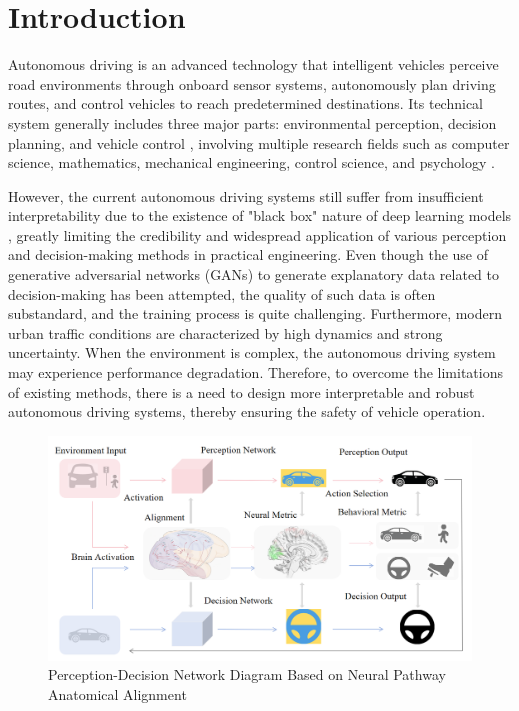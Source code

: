 \section{Introduction}
\label{sec:intro}
\hspace{1pc}Autonomous driving \cite{urmson2008autonomous} is an advanced technology that intelligent vehicles perceive road environments through onboard sensor systems, autonomously plan driving routes, and control vehicles to reach predetermined destinations. 
Its technical system generally includes three major parts: environmental perception, decision planning, and vehicle control \cite{amini2020learning, montemerlo2008junior}, involving multiple research fields such as computer science, mathematics, mechanical engineering, control science, and psychology \cite{chen2015deepdriving}.


However, the current autonomous driving systems still suffer from insufficient interpretability due to the existence of "black box" nature of deep learning models \cite{7979332}, greatly limiting the credibility and widespread application of various perception and decision-making methods in practical engineering. 
Even though the use of generative adversarial networks (GANs) \cite{zugner2020adversarial} to generate explanatory data related to decision-making has been attempted, the quality of such data is often substandard, and the training process is quite challenging. 
Furthermore, modern urban traffic conditions are characterized by high dynamics and strong uncertainty. 
When the environment is complex, the autonomous driving system may experience performance degradation. 
Therefore, to overcome the limitations of existing methods, there is a need to design more interpretable and robust autonomous driving systems, thereby ensuring the safety of vehicle operation.
\begin{figure}[t]
	\centering
	\includegraphics[width=0.95\linewidth]{brain_inspired.png}
	
	\caption{Perception-Decision Network Diagram Based on Neural Pathway Anatomical Alignment}
	\label{fig:fig1}
\end{figure}


